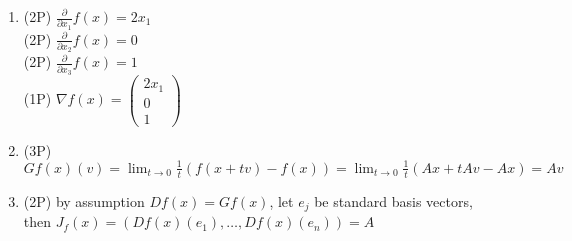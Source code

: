 {\color{solution}
\begin{enumerate}
\item \textcolor{exampoints}{(2P)}  $\frac{\partial}{\partial x_1} f(x) = 2x_1$\\
\textcolor{exampoints}{(2P)}  $\frac{\partial}{\partial x_2} f(x) = 0$\\
\textcolor{exampoints}{(2P)}  $\frac{\partial}{\partial x_3} f(x) = 1$\\
\textcolor{exampoints}{(1P)}  $\nabla f(x) = \begin{pmatrix}
 2x_1\\0\\1
\end{pmatrix}$ 
	\item \textcolor{exampoints}{(3P)} $Gf(x)(v)=\lim_{t\to 0}\frac{1}{t}(f(x+tv)-f(x))= \lim_{t\to 0}\frac{1}{t}(Ax + tAv-Ax) = Av$
	\item \textcolor{exampoints}{(2P)} by assumption $Df(x)=Gf(x)$, let $e_j$ be standard basis vectors, then $J_f(x) = (Df(x)(e_1),\ldots,Df(x)(e_n) ) = A$
\end{enumerate}
}
